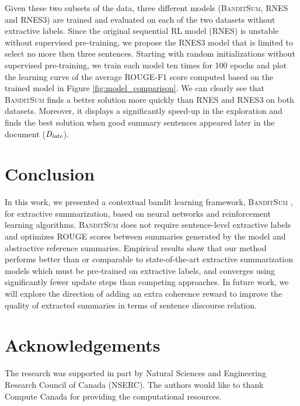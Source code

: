 \documentclass[11pt,a4paper]{article}
\newcommand{\B}{\textsc{BanditSum }}
\newcommand{\Bnospace}{\textsc{BanditSum}}
\begin{document}
Given these two subsets of the data, three different models (\Bnospace, RNES and RNES3) are trained and evaluated on each of the two datasets without extractive labels. Since the original sequential RL model (RNES) is unstable without supervised pre-training, we propose the RNES3 model that is limited to select no more then three sentences. Starting with random initializations without supervised pre-training, we train each model ten times for 100 epochs and plot the learning curve of the average ROUGE-F1 score computed based on the trained model in Figure \ref{fig:model_comparison}. We can clearly see that \B finds a better solution more quickly than RNES and RNES3 on both datasets. Moreover, it displays a significantly speed-up in the exploration and finds the best solution when good summary sentences appeared later in the document ($\mathit{D}_{\textit{late}}$).  








\section{Conclusion \label{sec:conclusion}}
In this work, we presented a contextual bandit learning framework, \B, for extractive summarization, based on neural networks and reinforcement learning algorithms. \B does not require sentence-level extractive labels and optimizes ROUGE scores between summaries generated by the model and abstractive reference summaries. Empirical results show that our method performs better than or comparable to state-of-the-art extractive summarization models which must be pre-trained on extractive labels, and converges using significantly fewer update steps than competing approaches. In future work, we will explore the direction of adding an extra coherence reward \citep{DBLP:conf/aaai/WuH18} to improve the quality of extracted summaries in terms of sentence discourse relation. 




\section*{Acknowledgements}
The research was supported in part by Natural Sciences and Engineering Research Council of Canada (NSERC). The authors would like to thank Compute Canada for providing the computational resources.





\onecolumn
\end{document}
